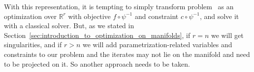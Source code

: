 With this representation, it is tempting to simply transform problem~ as an optimization over $\mathbb{R}^r$ with objective $f \circ \psi^{-1}$ and constraint $c \circ \psi^{-1}$, and solve it with a classical solver.
But, as we stated in Section~\ref{sec:introduction_to_optimization_on_manifolds}, if $r=n$ we will get singularities, and if $r>n$ we will add parametrization-related variables and constraints to our problem and the iterates may not lie on the manifold and need to be projected on it.
So another approach needs to be taken.



